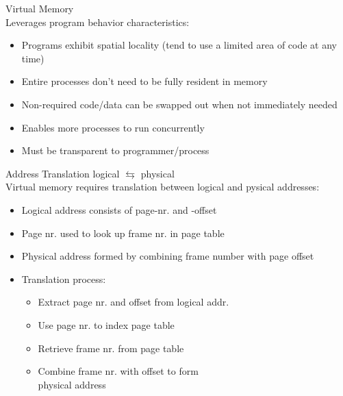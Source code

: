 
\begin{definition}{Virtual Memory}\\
    Leverages program behavior characteristics:
    \begin{itemize}
        \item Programs exhibit spatial locality (tend to use a limited area of code at any time)
        \item Entire processes don't need to be fully resident in memory
        \item Non-required code/data can be swapped out when not immediately needed
        \item Enables more processes to run concurrently
        \item Must be transparent to programmer/process
    \end{itemize}
\end{definition}

\begin{concept}{Address Translation} logical $\leftrightarrows$ physical\\
    Virtual memory requires translation between logical and pysical addresses:
    \begin{itemize}
        \item Logical address consists of page-nr. and -offset
        \item Page nr. used to look up frame nr. in page table
        \item Physical address formed by combining frame number with page offset
        \item Translation process:
            \begin{itemize}
                \item Extract page nr. and offset from logical addr.
                \item Use page nr. to index page table
                \item Retrieve frame nr. from page table
                \item Combine frame nr. with offset to form \\ physical address
            \end{itemize}
    \end{itemize}
\end{concept}


